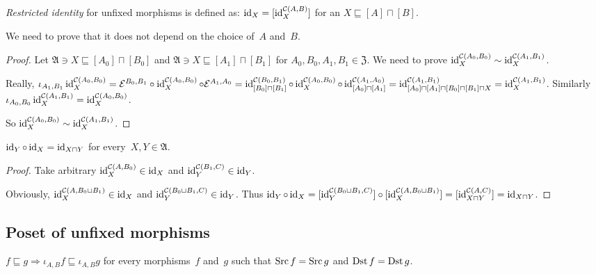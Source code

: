 \begin{defn}
\emph{Restricted identity} for unfixed morphisms is
defined as: $\operatorname{id}_X = [\operatorname{id}^{\mathcal{C}(A,B)}_X]$ for
an $X\sqsubseteq[A]\sqcap[B]$.
\end{defn}

We need to prove that it does not depend on the choice
of~$A$ and~$B$.

\begin{proof}
Let $\mathfrak{A}\ni X\sqsubseteq[A_0]\sqcap[B_0]$ and
$\mathfrak{A}\ni X\sqsubseteq[A_1]\sqcap[B_1]$ for
$A_0,B_0,A_1,B_1\in\mathfrak{Z}$. We need to prove
$\operatorname{id}^{\mathcal{C}(A_0,B_0)}_X\sim
\operatorname{id}^{\mathcal{C}(A_1,B_1)}_X$.

Really, $\iota_{A_1,B_1}\operatorname{id}^{\mathcal{C}(A_0,B_0)}_X =
\mathcal{E}^{B_0,B_1}\circ\operatorname{id}^{\mathcal{C}(A_0,B_0)}_X
\circ \mathcal{E}^{A_1,A_0} =
\operatorname{id}^{\mathcal{C}(B_0,B_1)}_{[B_0]\sqcap[B_1]}\circ
\operatorname{id}^{\mathcal{C}(A_0,B_0)}_X\circ
\operatorname{id}^{\mathcal{C}(A_1,A_0)}_{[A_0]\sqcap[A_1]} =
\operatorname{id}^{\mathcal{C}(A_1,B_1)}_{[A_0]\sqcap[A_1]\sqcap[B_0]\sqcap[B_1]\sqcap X} =
\operatorname{id}^{\mathcal{C}(A_1,B_1)}_X$.
Similarly
$\iota_{A_0,B_0}\operatorname{id}^{\mathcal{C}(A_1,B_1)}_X =
\operatorname{id}^{\mathcal{C}(A_0,B_0)}_X$.

So $\operatorname{id}^{\mathcal{C}(A_0,B_0)}_X\sim
\operatorname{id}^{\mathcal{C}(A_1,B_1)}_X$.
\end{proof}

\begin{prop}
$\operatorname{id}_Y\circ\operatorname{id}_X=\operatorname{id}_{X\sqcap Y}$ for
every~$X,Y\in\mathfrak{A}$.
\end{prop}

\begin{proof}
Take arbitrary $\operatorname{id}^{\mathcal{C}(A,B_0)}_X\in\operatorname{id}_X$ and
$\operatorname{id}^{\mathcal{C}(B_1,C)}_Y\in\operatorname{id}_Y$.

Obviously,
$\operatorname{id}^{\mathcal{C}(A,B_0\sqcup B_1)}_X\in\operatorname{id}_X$ and
$\operatorname{id}^{\mathcal{C}(B_0\sqcup B_1,C)}_Y\in\operatorname{id}_Y$.
Thus
$\operatorname{id}_Y\circ\operatorname{id}_X=
[\operatorname{id}^{\mathcal{C}(B_0\sqcup B_1,C)}_Y]\circ
[\operatorname{id}^{\mathcal{C}(A,B_0\sqcup B_1)}_X]=
[\operatorname{id}^{\mathcal{C}(A,C)}_{X\sqcap Y}]=
\operatorname{id}_{X\sqcap Y}$.
\end{proof}

\subsection{Poset of unfixed morphisms}

\begin{lem}
$f\sqsubseteq g\Rightarrow
\iota_{A,B}f\sqsubseteq\iota_{A,B}g$ for every
morphisms~$f$ and~$g$ such that
$\operatorname{Src} f=\operatorname{Src} g$ and $\operatorname{Dst} f=\operatorname{Dst} g$.
\end{lem}


